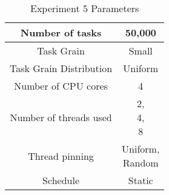 \begin{table}
\centering
 \begin{tabular}{|c|c|}
  \hline
  Number of tasks & 50,000 \\
  \hline
  Task Grain & Small \\
  \hline
  Task Grain Distribution & Uniform \\
  \hline
  Number of CPU cores & 4 \\
  \hline
  Number of threads used & \specialcell{2, \\ 4, \\ 8} \\
  \hline
  Thread pinning & \specialcell{Uniform, \\ Random} \\
  \hline
  Schedule & Static \\
  \hline
 \end{tabular}
\caption{Experiment 5 Parameters}
\iflabele
\label{table:evaluation_ex5_parameters}
\fi
{}
\end{table}

